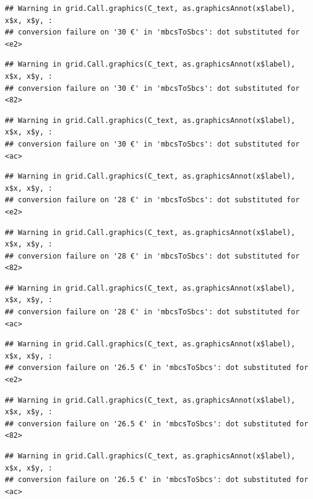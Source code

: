 \documentclass[
]{article}
\begin{document}
\begin{verbatim}
## Warning in grid.Call.graphics(C_text, as.graphicsAnnot(x$label), x$x, x$y, :
## conversion failure on '30 €' in 'mbcsToSbcs': dot substituted for <e2>
\end{verbatim}

\begin{verbatim}
## Warning in grid.Call.graphics(C_text, as.graphicsAnnot(x$label), x$x, x$y, :
## conversion failure on '30 €' in 'mbcsToSbcs': dot substituted for <82>
\end{verbatim}

\begin{verbatim}
## Warning in grid.Call.graphics(C_text, as.graphicsAnnot(x$label), x$x, x$y, :
## conversion failure on '30 €' in 'mbcsToSbcs': dot substituted for <ac>
\end{verbatim}

\begin{verbatim}
## Warning in grid.Call.graphics(C_text, as.graphicsAnnot(x$label), x$x, x$y, :
## conversion failure on '28 €' in 'mbcsToSbcs': dot substituted for <e2>
\end{verbatim}

\begin{verbatim}
## Warning in grid.Call.graphics(C_text, as.graphicsAnnot(x$label), x$x, x$y, :
## conversion failure on '28 €' in 'mbcsToSbcs': dot substituted for <82>
\end{verbatim}

\begin{verbatim}
## Warning in grid.Call.graphics(C_text, as.graphicsAnnot(x$label), x$x, x$y, :
## conversion failure on '28 €' in 'mbcsToSbcs': dot substituted for <ac>
\end{verbatim}

\begin{verbatim}
## Warning in grid.Call.graphics(C_text, as.graphicsAnnot(x$label), x$x, x$y, :
## conversion failure on '26.5 €' in 'mbcsToSbcs': dot substituted for <e2>
\end{verbatim}

\begin{verbatim}
## Warning in grid.Call.graphics(C_text, as.graphicsAnnot(x$label), x$x, x$y, :
## conversion failure on '26.5 €' in 'mbcsToSbcs': dot substituted for <82>
\end{verbatim}

\begin{verbatim}
## Warning in grid.Call.graphics(C_text, as.graphicsAnnot(x$label), x$x, x$y, :
## conversion failure on '26.5 €' in 'mbcsToSbcs': dot substituted for <ac>
\end{verbatim}
\end{document}
